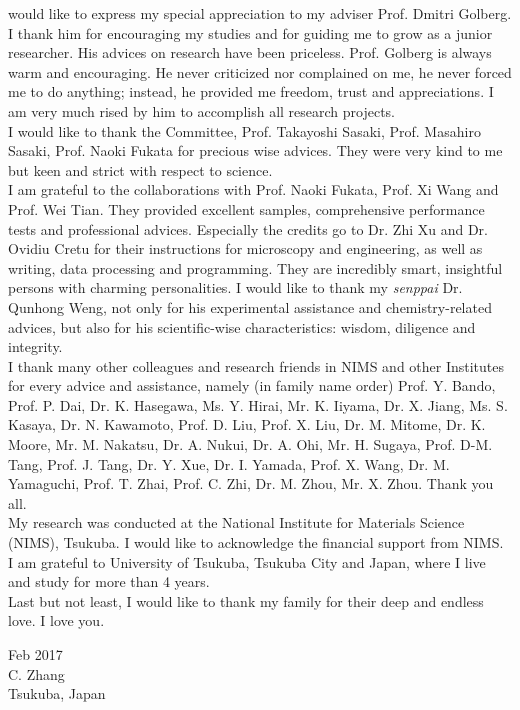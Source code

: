 
 would like to express my special appreciation to my adviser Prof. Dmitri Golberg. I thank him for encouraging my studies and for guiding me to grow as a junior researcher. His advices on research have been priceless. Prof. Golberg is always warm and encouraging. He never criticized nor complained on me, he never forced me to do anything; instead, he provided me freedom, trust and appreciations. I am very much rised by him to accomplish all research projects. \\
I would like to thank the Committee, Prof. Takayoshi Sasaki, Prof. Masahiro Sasaki, Prof. Naoki Fukata for precious wise advices. They were very kind to me but keen and strict with respect to science. \\
I am grateful to the collaborations with Prof. Naoki Fukata, Prof. Xi Wang and Prof. Wei Tian. They provided excellent samples, comprehensive performance tests and professional advices. 
Especially the credits go to Dr. Zhi Xu and Dr. Ovidiu Cretu for their instructions for microscopy and engineering, as well as writing, data processing and programming. They are incredibly smart, insightful persons with charming personalities. 
I would like to thank my {\em senppai} Dr. Qunhong Weng, not only for his experimental assistance and chemistry-related advices, but also for his scientific-wise characteristics: wisdom, diligence and integrity. \\
I thank many other colleagues and research friends in NIMS and other Institutes for every advice and assistance, namely (in family name order) Prof. Y. Bando, Prof. P. Dai, Dr. K. Hasegawa, Ms. Y. Hirai, Mr. K. Iiyama, Dr. X. Jiang, Ms. S. Kasaya, Dr. N. Kawamoto, Prof. D. Liu, Prof. X. Liu, Dr. M. Mitome, Dr. K. Moore, Mr. M. Nakatsu, Dr. A. Nukui, Dr. A. Ohi, Mr. H. Sugaya, Prof. D-M. Tang, Prof. J. Tang, Dr. Y. Xue, Dr. I. Yamada, Prof. X. Wang, Dr. M. Yamaguchi, Prof. T. Zhai, Prof. C. Zhi, Dr. M. Zhou, Mr. X. Zhou. Thank you all. 
\\
My research was conducted at the National Institute for Materials Science (NIMS), Tsukuba. I would like to acknowledge the financial support from NIMS.\\
I am grateful to University of Tsukuba, Tsukuba City and Japan, where I live and study for more than 4 years. \\
Last but not least, I would like to thank my family for their deep and endless love. I love you. \\[9ex]

\begin{flushright}
Feb 2017\\
C. Zhang\\
Tsukuba, Japan
\end{flushright}

